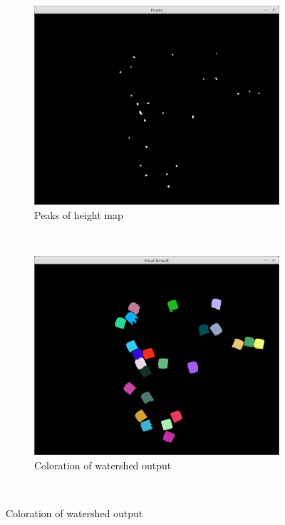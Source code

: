 \documentclass{../Vorlage/sebDenCls}
\begin{document}
\begin{figure}[htp]
\begin{subfigure}{0.5\textwidth}
  	\includegraphics[width=.9\textwidth]{peaks} 
  	\caption{Peaks of height map\label{heightmap}}
  \end{subfigure}%
  ~
  \begin{subfigure}{0.5\textwidth}
  	\includegraphics[width=.9\textwidth]{watershed} 
  	\caption{Coloration of watershed output\label{watershed}}
  \end{subfigure}\\


\end{figure}
\end{document}

